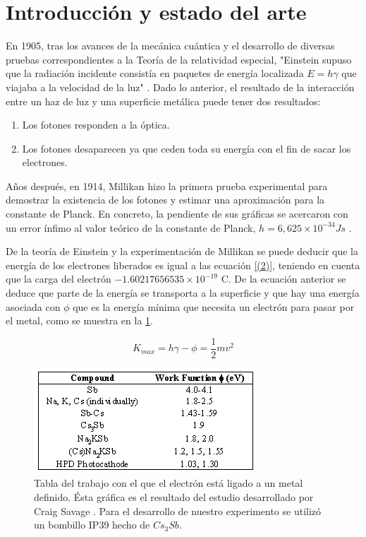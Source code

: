 \documentclass[%
 reprint,
 amsmath,amssymb,
 aps,
]{revtex4-1}
\begin{document}

\section{\label{intro} Introducción y estado del arte}

En 1905, tras los avances de la mecánica cuántica y el desarrollo de diversas pruebas correspondientes a la Teoría de la relatividad especial, "Einstein supuso que la radiación incidente consistía en paquetes de energía localizada $E = h \gamma$ que viajaba a la velocidad de la luz" \cite{Einstein}. Dado lo anterior, el resultado de la interacción entre un haz de luz y una superficie metálica puede tener dos resultados:

\begin{enumerate}
    \item Los fotones responden a la óptica.
    \item Los fotones desaparecen ya que ceden toda su energía con el fin de sacar los electrones.
\end{enumerate}

Años después, en 1914, Millikan hizo la primera prueba experimental para demostrar la existencia de los fotones y estimar una aproximación para la constante de Planck. En concreto, la pendiente de sus gráficas se acercaron con un error ínfimo al valor teórico de la constante de Planck, $h = 6,625 \times 10^{-34} Js$ \cite{Millikan}.

De la teoría de Einstein y la experimentación de Millikan se puede deducir que la energía de los electrones liberados es igual a las ecuación \eqref{(2)}, teniendo en cuenta que la carga del electrón $-1.60217656535 \times 10^{-19}$ C. De la ecuación anterior se deduce que parte de la energía se transporta a la superficie y que hay una energía asociada con $\phi$ que es la energía mínima que necesita un electrón para pasar por el metal, como se muestra en la \ref{fig:trabajo_metal}. 

\begin{equation}\label{(2)}
  K_{max} = h \gamma - \phi = \frac{1}{2} m v^2
\end{equation}

\begin{figure}[H]
    \centering
    \includegraphics[scale= 0.5]{Trabajo_del_metal.png}
    \caption{Tabla del trabajo con el que el electrón está ligado a un metal definido. Ésta gráfica es el resultado del estudio desarrollado por Craig Savage \cite{funcion_de_trabajo_del_metal}. Para el desarrollo de nuestro experimento se utilizó un bombillo IP39 hecho de $Cs_3Sb$.}
    \label{fig:trabajo_metal}
\end{figure}
\end{document}
